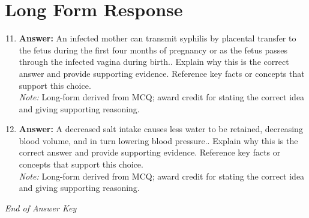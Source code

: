 \documentclass[12pt]{article}
\begin{document}
\section*{Long Form Response}
\begin{enumerate}[label=\arabic*.]
\setcounter{enumi}{10}
\item \textbf{Answer:} An infected mother can transmit syphilis by placental transfer to the fetus during the first four months of pregnancy or as the fetus passes through the infected vagina during birth.. Explain why this is the correct answer and provide supporting evidence. Reference key facts or concepts that support this choice.
\\ \textit{Note:} Long-form derived from MCQ; award credit for stating the correct idea and giving supporting reasoning.
\item \textbf{Answer:} A decreased salt intake causes less water to be retained, decreasing blood volume, and in turn lowering blood pressure.. Explain why this is the correct answer and provide supporting evidence. Reference key facts or concepts that support this choice.
\\ \textit{Note:} Long-form derived from MCQ; award credit for stating the correct idea and giving supporting reasoning.
\end{enumerate}

\vfill
\noindent\textit{End of Answer Key}
\end{document}
